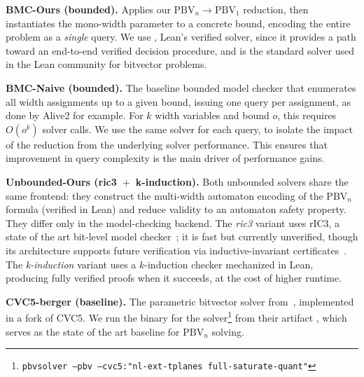 \noindent\textbf{BMC-Ours (bounded).}
Applies our $\text{PBV}_n \to \text{PBV}_1$ reduction, then instantiates the
mono-width parameter to a concrete bound, encoding the entire problem as a
\emph{single} \qfbv{} query. We use \bvdecide{}, Lean's verified \qfbv{} solver,
since it provides a path toward an end-to-end verified decision procedure,
and is the standard solver used in the Lean community for bitvector problems.

\noindent\textbf{BMC-Naive (bounded).}
The baseline bounded model checker that enumerates all width assignments up to a given bound,
issuing one \qfbv{} query per assignment, as done by Alive2 for example.
For $k$ width variables and bound $o$, this requires $O(o^k)$ solver calls.
We use the same \bvdecide{} solver for each query, to isolate the impact of the reduction from the underlying solver performance.
This ensures that improvement in query complexity is the main driver of performance gains.

\noindent\textbf{Unbounded-Ours (ric3~$+$~k-induction).}
Both unbounded solvers share the same frontend: they construct the multi-width automaton
encoding of the $\text{PBV}_n$ formula (verified in Lean) and reduce validity to an
automaton safety property. They differ only in the model-checking backend.
The \emph{ric3} variant uses rIC3, a state of the art bit-level model checker~\cite{ric3};
it is fast but currently unverified, though its architecture supports future verification
via inductive-invariant certificates~\cite{hwmcc_certs}.
The \emph{k-induction} variant uses a $k$-induction checker mechanized in Lean,
producing fully verified proofs when it succeeds, at the cost of higher runtime.

\noindent\textbf{CVC5-berger (baseline).}
The parametric bitvector solver from~\citet{bit-precise-parametric-bv},
implemented in a fork of CVC5. We run the binary for the solver\footnote{\texttt{pbvsolver --pbv --cvc5:"nl-ext-tplanes full-saturate-quant"}}  from their artifact
\cite{zohar_2025_15143242}, which serves as the state of the art baseline for $\text{PBV}_n$ solving.

% 
%
%


